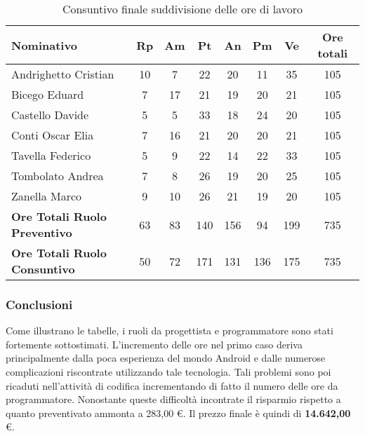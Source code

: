 \documentclass[../PianoProgetto.tex]{subfiles}
\begin{document}
	\begin{table}[H]
		\begin{tabularx}{\textwidth}{l  * {6}{C}  c}
			\toprule
			\textbf{Nominativo} & \textbf{Rp} & \textbf{Am} & \textbf{Pt} 
						& \textbf{An} & \textbf{Pm} & \textbf{Ve} & \textbf{Ore totali} \\
			\midrule
			Andrighetto Cristian & 10 & 7 & 22 & 20 & 11 & 35 &	105 \\
			Bicego Eduard & 7 & 17 & 21 & 19 & 20 & 21 & 105 \\
			Castello Davide & 5 & 5 & 33 & 18 & 24 & 20 & 105 \\
			Conti Oscar Elia & 7 & 16 & 21 & 20 & 20 & 21 & 105 \\
			Tavella Federico &	5 & 9 & 22 & 14 & 22 & 33 & 105 \\
			Tombolato Andrea & 7 & 8 & 26 & 19 & 20 & 25 & 105 \\
			Zanella Marco & 9 & 10 & 26 & 21 & 19 & 20 & 105 \\
			\toprule			
			\textbf{Ore Totali Ruolo Preventivo} & 63 & 83 & 140 & 156 & 94 & 199 & 735 \\
			\midrule
			\textbf{Ore Totali Ruolo Consuntivo} & 50 & 72 & 171 & 131 & 136 & 175 & 735 \\
			\bottomrule
		\end{tabularx}
		\caption{Consuntivo finale suddivisione delle ore di lavoro}
		\label{tab:consuntivo_finale_rendicontate_ore}
	\end{table}     
     
     \subsubsection{Conclusioni}
     	Come illustrano le tabelle, i ruoli da progettista e programmatore sono stati fortemente sottostimati. L'incremento delle ore nel primo caso deriva principalmente dalla poca esperienza del mondo Android e dalle numerose complicazioni riscontrate utilizzando tale tecnologia. Tali problemi sono poi ricaduti nell'attività di codifica incrementando di fatto il numero delle ore da programmatore. Nonostante queste difficoltà incontrate il risparmio rispetto a quanto preventivato ammonta a 283,00 \euro{}. Il prezzo finale è quindi di \textbf{14.642,00} \euro{}.
     
\end{document}
